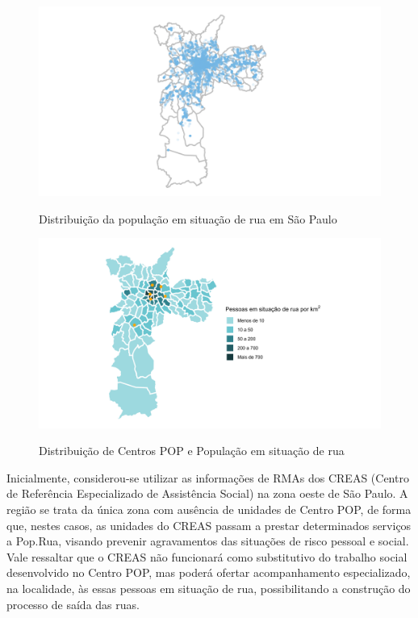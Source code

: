 \begin{figure}
    \caption{Distribuição da população em situação de rua em São Paulo }
    \includegraphics[width = .9\linewidth]{relatorios/grupo2/figuras/distribuicao.png}
    \label{fig:distrib}
\end{figure}
\begin{figure}
    \caption{Distribuição de Centros POP e População em situação de rua}
    \includegraphics[width = .9\linewidth]{relatorios/grupo2/figuras/sp.png}
    \label{fig:sp}
\end{figure}

Inicialmente, considerou-se utilizar as informações de RMAs dos CREAS (Centro de Referência Especializado de Assistência Social) na zona oeste de São Paulo. A região se trata da única zona com ausência de unidades de Centro POP, de forma que, nestes casos, as unidades do CREAS passam a prestar determinados serviços a Pop.Rua, visando prevenir agravamentos das situações de risco pessoal 
e social. Vale ressaltar que o CREAS não funcionará como substitutivo do trabalho social desenvolvido no Centro POP, mas poderá ofertar acompanhamento especializado, na localidade, às essas pessoas em situação de rua, possibilitando a construção do processo de saída das ruas. 

